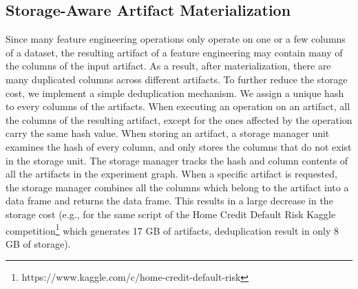 %
%
\subsection{Storage-Aware Artifact Materialization}
Since many feature engineering operations only operate on one or a few columns of a dataset, the resulting artifact of a feature engineering may contain many of the columns of the input artifact.
As a result, after materialization, there are many duplicated columns across different artifacts.
To further reduce the storage cost, we implement a simple deduplication mechanism.
We assign a unique hash to every columns of the artifacts.
When executing an operation on an artifact, all the columns of the resulting artifact, except for the ones affected by the operation carry the same hash value.
When storing an artifact, a storage manager unit examines the hash of every column, and only stores the columns that do not exist in the storage unit.
The storage manager tracks the hash and column contents of all the artifacts in the experiment graph.
When a specific artifact is requested, the storage manager combines all the columns which belong to the artifact into a data frame and returns the data frame.
This results in a large decrease in the storage cost (e.g., for the same script of the Home Credit Default Risk Kaggle competition\footnote{https://www.kaggle.com/c/home-credit-default-risk} which generates 17 GB of artifacts, deduplication result in only 8 GB of storage).

